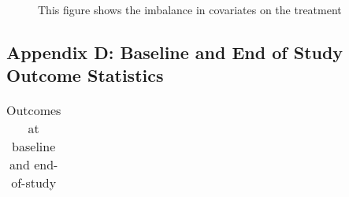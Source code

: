 \documentclass[
  single column]{article}
\begin{document}
\begin{figure}


\caption{\label{fig-match_1}This figure shows the imbalance in
covariates on the treatment}

\end{figure}%

\subsection{Appendix D: Baseline and End of Study Outcome
Statistics}\label{appendix-outcomes}

\begin{longtable}[]{@{}
  >{\raggedright\arraybackslash}p{}
  >{\raggedright\arraybackslash}p{}
  >{\raggedright\arraybackslash}p{}@{}}

\caption{\label{tbl-table-outcomes}Outcomes at baseline and
end-of-study}

\tabularnewline


\end{longtable}
\end{document}
